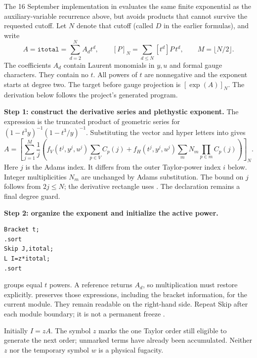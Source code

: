 \label{sec:degree-bounded}
The 16 September implementation in  evaluates the
same finite exponential as the auxiliary-variable recurrence above, but avoids
products that cannot survive the requested cutoff. Let $N$ denote that cutoff
(called $D$ in the earlier formulas), and write
\[
 A=\texttt{itotal}=\sum_{d=2}^{N}A_d t^d,\qquad
 [P]_N=\sum_{d\leq N}[t^d]P\,t^d,\qquad M=\lfloor N/2\rfloor.
\]
The coefficients $A_d$ contain Laurent monomials in $y,u$ and formal gauge
characters. They contain no $t$. All powers of $t$ are nonnegative and the
exponent starts at degree two. The target before gauge projection is
$[\exp(A)]_N$. The derivation below follows the project's generated program.

\textbf{Step 1: construct the derivative series and plethystic exponent.}
The expression  is the truncated product of geometric series for
$(1-t^3y)^{-1}(1-t^3/y)^{-1}$. Substituting the vector and hyper letters into
 gives
\[
 A=\left[\sum_{j=1}^{M}\frac{1}{j}
 \left(f_V(t^j,y^j,u^j)\sum_{p\in V}C_p(j)
 +f_H(t^j,y^j,u^j)\sum_m N_m\prod_{p\in m}C_p(j)\right)\right]_N.
\]
Here $j$ is the Adams index. It differs from the outer Taylor-power index $i$
below. Integer multiplicities $N_m$ are unchanged by Adams substitution.
The bound on $j$ follows from $2j\leq N$; the derivative rectangle uses
. The declaration  remains a final degree guard.

\textbf{Step 2: organize the exponent and initialize the active power.}
\begin{lstlisting}
Bracket t;
.sort
Skip J,itotal;
L I=z*itotal;
.sort
\end{lstlisting}
 groups equal $t$ powers. A reference 
returns $A_d$, so multiplication must restore  explicitly.
 preserves those expressions, including the bracket
information, for the current module. They remain readable on the right-hand
side. Repeat Skip after each module boundary; it is not a permanent freeze
\cite[entries ``bracket'', ``skip'', and Chapter 9]{form-current}.

Initially $I=zA$. The symbol $z$ marks the one Taylor order still eligible
to generate the next order; unmarked terms have already been accumulated.
Neither $z$ nor the temporary symbol $w$ is a physical fugacity.

